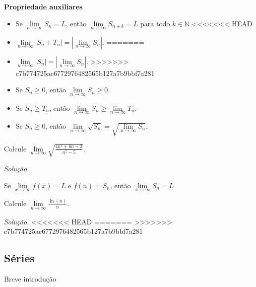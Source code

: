 \newpage
\textbf{Propriedade auxiliares}
\begin{itemize}
	\item Se  $\lim\limits_{n\longrightarrow \infty} S_{n}=L$, então $\lim\limits_{n\longrightarrow \infty} S_{n+k}=L$ para todo $k\in \mathbb{N} $
<<<<<<< HEAD
	\item $\lim\limits_{n\longrightarrow \infty} \left|  S_{n}\pm T_{n}\right|  =\left| \lim\limits_{n\longrightarrow \infty}  S_{n}\right| $.
=======
	\item $\lim\limits_{n\longrightarrow \infty} \left|  S_{n}\right|  =\left| \lim\limits_{n\longrightarrow \infty}  S_{n}\right| $.
>>>>>>> c7b774725ac6772976482565b127a7b9bbf7a281
	\item Se $S_{n}\geq 0$, então $\lim\limits_{n\longrightarrow \infty} S_{n} \geq 0$.
	\item Se $S_{n}\geq T_{n}$, então $\lim\limits_{n\longrightarrow \infty} S_{n} \geq \lim\limits_{n\longrightarrow \infty}T_{n}$.
	\item Se $S_{n}\geq 0$, então $\lim\limits_{n\longrightarrow \infty} \sqrt{S_{n}} =\sqrt{\lim\limits_{n\longrightarrow \infty} S_{n} }$.
\end{itemize}
\begin{ex}
	Calcule $\lim\limits_{n\longrightarrow \infty}\sqrt{\frac{4n^{2}+6n+3}{n^{2}-5}} $.
\end{ex}
\textit{Solução.}
\vspace*{5cm}
\begin{teo} 
	Se $\lim\limits_{x\longrightarrow \infty} f(x)=L$ e $f(n)=S_{n}$, então $\lim\limits_{x\longrightarrow \infty} S_{n}=L$
\end{teo}
\begin{ex}
	Calcule $\lim\limits_{n\longrightarrow \infty}\frac{\ln (n)}{n} $.
\end{ex}
\textit{Solução.}
\vspace*{5cm}
<<<<<<< HEAD
=======
>>>>>>> c7b774725ac6772976482565b127a7b9bbf7a281
\begin{center}
\section{Séries}
\end{center}
Breve introdução
\vspace*{5cm}
